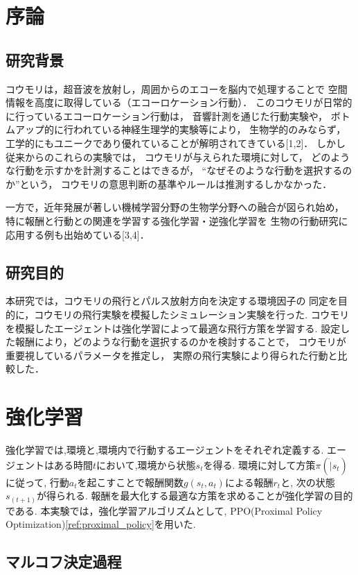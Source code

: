 \documentclass[upLatex]{jsreport}
\begin{document}
\tableofcontents

\newpage
\chapter{序論}
\section{研究背景}
コウモリは，超音波を放射し，周囲からのエコーを脳内で処理することで
空間情報を高度に取得している（エコーロケーション行動）．
このコウモリが日常的に行っているエコーロケーション行動は，
音響計測を通じた行動実験や，
ボトムアップ的に行われている神経生理学的実験等により，
生物学的のみならず，
工学的にもユニークであり優れていることが解明されてきている[1,2]．
しかし従来からのこれらの実験では，
コウモリが与えられた環境に対して，
どのような行動を示すかを計測することはできるが，
“なぜそのような行動を選択するのか”という，
コウモリの意思判断の基準やルールは推測するしかなかった．

一方で，近年発展が著しい機械学習分野の生物学分野への融合が図られ始め，
特に報酬と行動との関連を学習する強化学習・逆強化学習を
生物の行動研究に応用する例も出始めている[3,4]．

\section{研究目的}
本研究では，コウモリの飛行とパルス放射方向を決定する環境因子の
同定を目的に，コウモリの飛行実験を模擬したシミュレーション実験を行った.
コウモリを模擬したエージェントは強化学習によって最適な飛行方策を学習する.
設定した報酬により，どのような行動を選択するのかを検討することで，
コウモリが重要視しているパラメータを推定し，
実際の飛行実験により得られた行動と比較した．


\newpage
\chapter{強化学習}
強化学習では,環境と,環境内で行動するエージェントをそれぞれ定義する.
エージェントはある時間$t$において,環境から状態$s_t$を得る.
環境に対して方策$\pi(\dot|s_t)$に従って,
行動$a_t$を起こすことで報酬関数$g(s_t,a_t)$による報酬$r_t$と, 
次の状態$s_(t+1)$が得られる.
報酬を最大化する最適な方策を求めることが強化学習の目的である.
本実験では，強化学習アルゴリズムとして,
PPO(Proximal Policy Optimization)\ref{ref:proximal_policy}を用いた.

\section{マルコフ決定過程}
\end{document}
